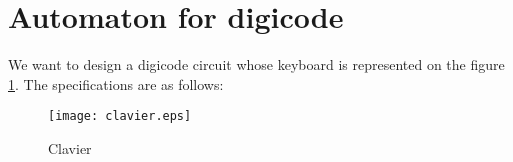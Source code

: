\documentclass[12pt]{article}
\begin{document}
{%
%
%

\newpage

\section{Automaton for digicode}

We want to design a digicode circuit whose keyboard is
represented on the figure \ref{Fig:keyboard}. 
The specifications are as follows:

\begin{figure}[H]\centering
  \texttt{[image: clavier.eps]}
  \caption{Clavier}
  \label{Fig:keyboard}
\end{figure}

}
\end{document}
